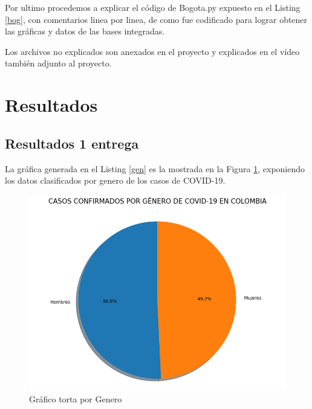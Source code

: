 \documentclass[conference,compsoc,onecolumn]{IEEEtran}
\begin{document}


Por ultimo procedemos a explicar el código de Bogota.py expuesto en el Listing \ref{bog}, con comentarios linea por linea, de como fue codificado para lograr obtener las gráficas y datos de las bases integradas.



Los archivos no explicados son anexados en el proyecto y explicados en el vídeo también adjunto al proyecto.


\section{Resultados}
\subsection{Resultados 1 entrega}\label{sec:re1}
La gráfica generada en el Listing \ref{gen} es la mostrada en la Figura \ref{g1}, exponiendo los datos clasificados por genero de los casos de COVID-19.


\begin{figure}[H]
    \centering
    \includegraphics[scale=0.4]{Pictures/GraficoTorta_Genero_Covid_Colombia_30-09-20.png}
    \caption{Gráfico torta por Genero}
    \label{g1}
\end{figure}
\end{document}
